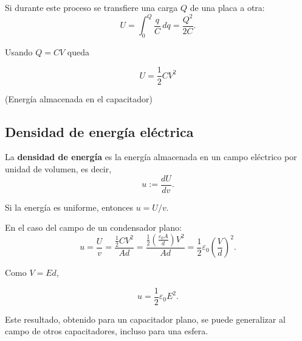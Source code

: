 Si durante este proceso se transfiere una carga $Q$ de una placa a otra:
$$U = \int_0^Q \frac{q}{C} \,dq = \frac{Q^2}{2C}.$$

Usando $Q = CV$ queda
\begin{shaded}
 \begin{equation*}
U = \frac{1}{2} CV^2
\end{equation*}
\begin{center}
(Energía almacenada en el capacitador)
\end{center}   
\end{shaded}

\subsection*{Densidad de energía eléctrica}

La \textbf{densidad de energía} es la energía  almacenada en un campo eléctrico por unidad de volumen, es decir,
$$u := \frac{dU}{dv}.$$

Si la energía es uniforme, entonces $u = U/v$.

En el caso del campo de un condensador plano:
$$u = \frac{U}{v} = \frac{\frac{1}{2}CV^2}{Ad} = \frac{\frac{1}{2} \left( \frac{\varepsilon_0 A}{d} \right)V^2}{Ad} = \frac{1}{2} \varepsilon_0 \left( \frac{V}{d} \right)^2.$$

Como $V = Ed$,
\begin{shaded}
   $$ u = \frac{1}{2} \varepsilon_0 E^2.$$
\end{shaded}

Este resultado, obtenido para un capacitador plano, se puede generalizar al campo de otros capacitadores, incluso para una esfera.

